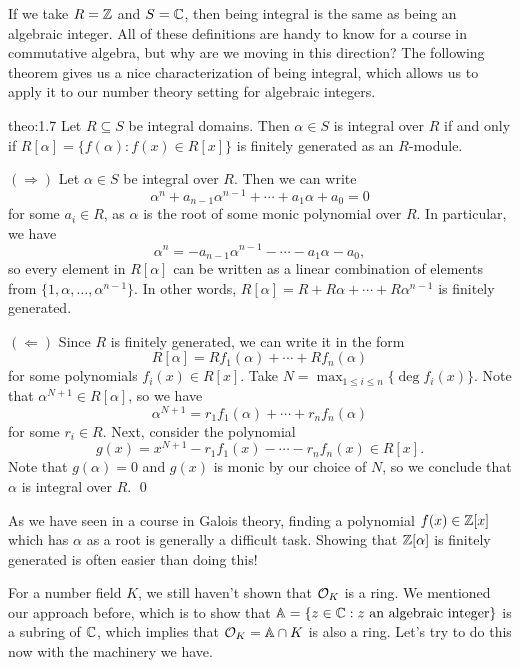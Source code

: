 If we take $R = \mathbb{Z}$ and $S = \mathbb{C}$, then being integral is the same as 
being an algebraic integer. All of these definitions are handy to know
for a course in commutative algebra, but why are we moving in this direction? 
The following theorem gives us a nice characterization of being integral, 
which allows us to apply it to our number theory setting for algebraic integers.

\begin{theo}{theo:1.7}
    Let $R \subseteq S$ be integral domains. Then $\alpha \in S$ is integral 
    over $R$ if and only if $R[\alpha] = \{f(\alpha) : f(x) \in R[x]\}$ is 
    finitely generated as an $R$-module. 
\end{theo}\vspace{-0.25cm}\newpage
\begin{pf}
    $(\Rightarrow)$ Let $\alpha \in S$ be integral over $R$. Then we can write 
    \[ \alpha^n + a_{n-1} \alpha^{n-1} + \cdots + a_1 \alpha + a_0 = 0 \] 
    for some $a_i \in R$, as $\alpha$ is the root of some monic polynomial over 
    $R$. In particular, we have 
    \[ \alpha^n = -a_{n-1} \alpha^{n-1} - \cdots - a_1 \alpha - a_0, \] 
    so every element in $R[\alpha]$ can be written as a linear combination 
    of elements from $\{1, \alpha, \dots, \alpha^{n-1}\}$. In other words, 
    $R[\alpha] = R + R\alpha + \cdots + R\alpha^{n-1}$ is finitely generated. 

    $(\Leftarrow)$ Since $R$ is finitely generated, we can write it in the form 
    \[ R[\alpha] = Rf_1(\alpha) + \cdots + Rf_n(\alpha) \] 
    for some polynomials $f_i(x) \in R[x]$. Take $N = \max_{1\leq i \leq n} 
    \{\deg f_i(x)\}$. Note that $\alpha^{N+1} \in R[\alpha]$, so we have 
    \[ \alpha^{N+1} = r_1 f_1(\alpha) + \cdots + r_n f_n(\alpha) \] 
    for some $r_i \in R$. Next, consider the polynomial 
    \[ g(x) = x^{N+1} - r_1 f_1(x) - \cdots - r_n f_n(x) \in R[x]. \] 
    Note that $g(\alpha) = 0$ and $g(x)$ is monic by our choice of $N$, so we conclude that 
    $\alpha$ is integral over $R$. \qed 
\end{pf}\vspace{-0.25cm}

As we have seen in a course in Galois theory, finding a polynomial 
$f(x) \in \mathbb{Z}[x]$ which has $\alpha$ as a root is generally a difficult task.
Showing that $\mathbb{Z}[\alpha]$ is finitely generated is often easier than doing this!

For a number field $K$, we still haven't shown that ${\cal O}_K$ is a ring. 
We mentioned our approach before, which is to show that 
$\mathbb{A} = \{z \in \mathbb{C} : z \text{ an algebraic integer}\}$ is a 
subring of $\mathbb{C}$, which implies that ${\cal O}_K = \mathbb{A} \cap K$ is also 
a ring. Let's try to do this now with the machinery we have. 

